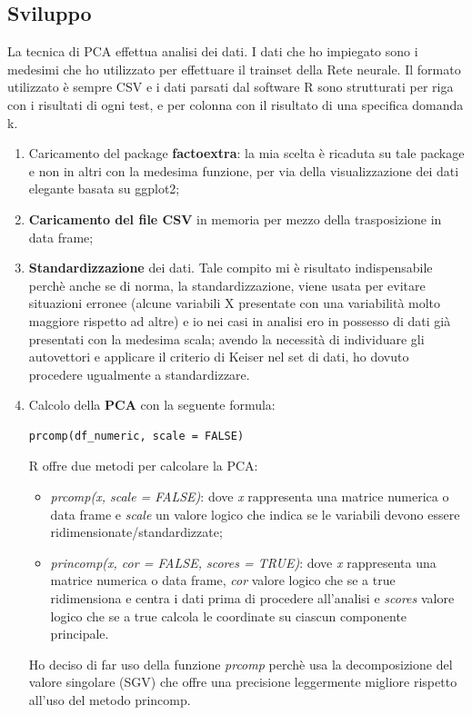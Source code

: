 \subsection{Sviluppo}
\label{Sviluppo}
La tecnica di PCA effettua analisi dei dati. I dati che ho impiegato sono i medesimi che ho utilizzato per effettuare il trainset della Rete neurale. Il formato utilizzato \`e sempre CSV e i dati parsati dal software R sono strutturati per riga con  i risultati di ogni test, e per colonna con il risultato di una specifica domanda k.
\begin{enumerate}
\item Caricamento del package \textbf{factoextra}: la mia scelta \`e ricaduta su tale package e non in altri con la medesima funzione, per via della visualizzazione dei dati elegante basata su ggplot2;
\item \textbf{Caricamento del file CSV} in memoria per mezzo della trasposizione in data frame;
\item \textbf{Standardizzazione} dei dati. Tale compito mi \`e risultato indispensabile  perch\`e anche se di norma, la standardizzazione, viene usata per evitare situazioni erronee (alcune variabili X presentate con una variabilit\`a molto maggiore rispetto ad altre) e io nei casi in analisi ero in possesso di dati gi\`a presentati con la medesima scala;  avendo la necessit\`a di individuare gli autovettori e applicare il criterio di Keiser nel set di dati, ho dovuto procedere ugualmente a standardizzare.
\item Calcolo della \textbf{PCA} con la seguente formula:
\begin{verbatim}
prcomp(df_numeric, scale = FALSE) 
\end{verbatim}
R offre due metodi per calcolare la PCA: 
\begin{itemize}
\item \textit{prcomp(x, scale = FALSE)}: dove \textit{x} rappresenta una matrice numerica o data frame e \textit{scale} un valore logico che indica se le variabili devono essere ridimensionate/standardizzate;
\item \textit{princomp(x, cor = FALSE, scores = TRUE)}: dove \textit{x} rappresenta una matrice numerica o data frame, \textit{cor} valore logico che se a true ridimensiona e centra i dati prima di procedere all'analisi e \textit{scores} valore logico che se a true calcola le coordinate su ciascun componente principale.\\
\end{itemize}
\noindent
Ho deciso di far uso della funzione \textit{prcomp} perch\`e usa la decomposizione del valore singolare (SGV) che offre una precisione leggermente migliore rispetto all'uso del metodo princomp.

\end{enumerate}
